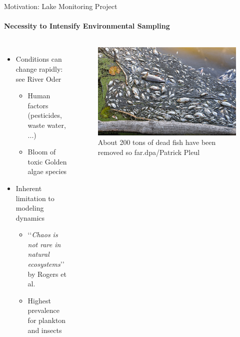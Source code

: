 \documentclass[xcolor=dvipsnames,envcountsect]{beamer}
\newcommand{\licensecc}{\href{https://en.wikipedia.org/wiki/Creative\_Commons}{\cc}}
\begin{document}
\begin{frame}{Motivation: Lake Monitoring Project}
\framesubtitle{Necessity to Intensify Environmental Sampling}
\begin{columns}
    \begin{itemize}
        \item Conditions can change rapidly: see River Oder
        \begin{itemize}
            \item Human factors (pesticides, waste water, ...)
            \item Bloom of toxic Golden algae species
        \end{itemize}
        \item Inherent limitation to modeling dynamics
        \begin{itemize}
            \item \lq\lq {\it Chaos is not rare in natural ecosystems}\rq\rq{} by Rogers et al.\cite{Rogers2022} 
            \item Highest prevalence for plankton and insects
        \end{itemize}
    \end{itemize}
        \begin{figure}
            \includegraphics[scale=.2, trim={1cm 0cm 18cm 0cm},clip=true]{oder_fish}
            \caption{About 200 tons of dead fish have been removed so far.\licensecc dpa/Patrick Pleul}
        \end{figure}
    \end{columns}
\end{frame}
\end{document}
